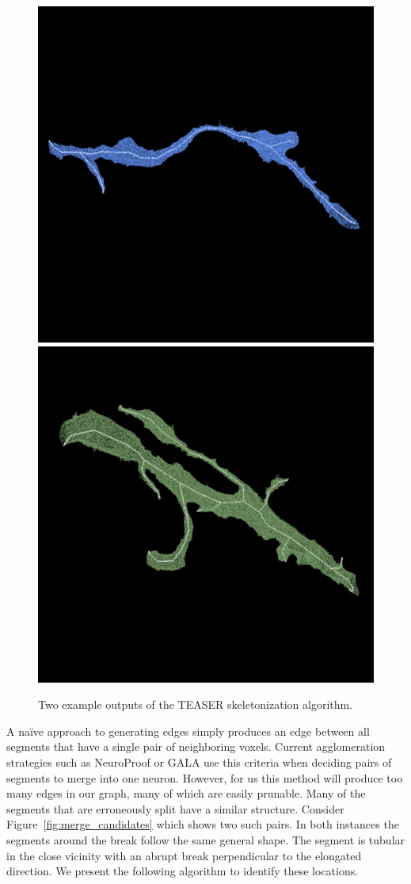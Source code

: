 \begin{figure}[t]
	\centering
	\includegraphics[width=0.42\linewidth]{./figures/skeleton1.png}
	\hspace{0.085\linewidth}
	\includegraphics[width=0.42\linewidth]{./figures/skeleton2.png}
	\caption{Two example outputs of the TEASER skeletonization algorithm.}
	\label{fig:skeletonization}
\end{figure}

A na\"ive approach to generating edges simply produces an edge between all segments that have a single pair of neighboring voxels.
Current agglomeration strategies such as NeuroProof or GALA use this criteria when deciding pairs of segments to merge into one neuron.
However, for us this method will produce too many edges in our graph, many of which are easily prunable. 
Many of the segments that are erroneously split have a similar structure. 
Consider Figure~\ref{fig:merge_candidates} which shows two such pairs.
In both instances the segments around the break follow the same general shape. 
The segment is tubular in the close vicinity with an abrupt break perpendicular to the elongated direction.
We present the following algorithm to identify these locations.

